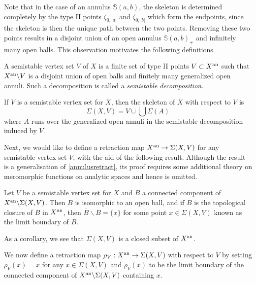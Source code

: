 Note that in the case of an annulus $\mathbb{S}(a, b)$, the skeleton is determined completely by the type II points $\zeta_{0, |a|}$ and $\zeta_{0, |b|}$ which form the endpoints, since the skeleton is then the unique path between the two points.
Removing these two points results in a disjoint union of an open annulus $\mathbb{S}(a, b)_{+}$ and infinitely many open balls.
This observation motivates the following definitions.

\begin{defn} \parencite[Definition 3.1]{bpr}
    A semistable vertex set $V$ of $X$ is a finite set of type II points $V \subset X^{\text{an}}$ such that $X^{\text{an}} \backslash V$ is a disjoint union of open balls and finitely many generalized open annuli.
    Such a decomposition is called a \textit{semistable decomposition}.
\end{defn}

\begin{defn} \parencite[Definition 3.3]{bpr}
    If $V$ is a semistable vertex set for $X$, then the skeleton of $X$ with respect to $V$ is
    \[
        \Sigma(X, V) = V \cup \bigcup \Sigma(A)
    \]
    where $A$ runs over the generalized open annuli in the semistable decomposition induced by $V$.
\end{defn}

Next, we would like to define a retraction map $X^{\text{an}} \to \Sigma(X, V)$ for any semistable vertex set $V$, with the aid of the following result.
Although the result is a generalisation of \cref{annulusretract}, its proof requires some additional theory on meromorphic functions on analytic spaces and hence is omitted.

\begin{lemma} \parencite[Lemma 3.4]{bpr}
    Let $V$ be a semistable vertex set for $X$ and $B$ a connected component of $X^{\text{an}} \backslash \Sigma(X, V)$.
    Then $B$ is isomorphic to an open ball, and if $\overline{B}$ is the topological closure of $B$ in $X^{\text{an}}$, then $\overline{B}\backslash B = \{ x \}$ for some point $x \in \Sigma(X, V)$ known as the limit boundary of $B$.
\end{lemma}

As a corollary, we see that $\Sigma(X, V)$ is a closed subset of $X^{\text{an}}$.

We now define a retraction map $\rho_{V}: X^{\text{an}} \to \Sigma(X, V)$ with respect to $V$  by setting $\rho_{V}(x) = x$ for any $x \in \Sigma(X, V)$ and $\rho_{V}(x)$ to be the limit boundary of the connected component of $X^{\text{an}} \backslash \Sigma(X, V)$ containing $x$.


